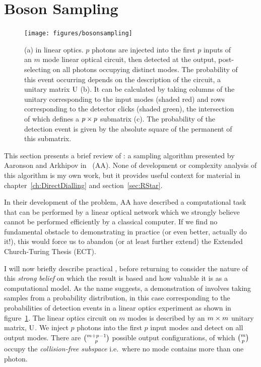 \section{Boson Sampling}
\label{sec:BosonSampling}
\begin{figure}
  \texttt{[image: figures/bosonsampling]}
  \caption[BosonSampling in linear optics]
  {(a) \bosonsampling{} in linear optics. \(p\) photons are injected into the
  first \(p\) inputs of an \(m\) mode linear optical circuit, then detected at
  the output, post-selecting on all photons occupying distinct modes. The
  probability of this event occurring depends on the description of the circuit,
  a unitary matrix \(\mathrm{U}\) (b). It can be calculated by taking columns of
  the unitary corresponding to the input modes (shaded red) and rows
  corresponding to the detector clicks (shaded green), the intersection of which
  defines a \(p \times p\) submatrix (c). The probability of the detection event is
  given by the absolute square of the permanent of this submatrix.}
  \label{fig:BosonSampling}
\end{figure}
This section presents a brief review of \bosonsampling{}: a sampling algorithm
presented by Aaronson and Arkhipov in~\cite{bosonsampling} (AA). None of
development or complexity analysis of this algorithm is my own work, but it
provides useful context for material in chapter~\ref{ch:DirectDialling} and
section~\ref{sec:RStar}.

In their development of the \bosonsampling{} problem, AA have described a
computational task that can be performed by a linear optical network which we
strongly believe cannot be performed efficiently by a classical computer. If we
find no
fundamental obstacle to demonstrating \bosonsampling{} in practice (or even
better, actually do it!), this would force us to abandon (or at least further
extend) the Extended Church-Turing Thesis (ECT).

I will now briefly describe practical \bosonsampling{}, before returning to
consider the nature of this \emph{strong belief} on which the result is based
and how valuable it is as a computational model. As the name suggests, a
demonstration of \bosonsampling{} involves taking samples from a probability
distribution, in this case corresponding to the probabilities of detection
events in a linear optics experiment as shown in figure~\ref{fig:BosonSampling}.
The linear optics circuit on \(m\) modes is described by an \(m \times m\) unitary
matrix, \(\mathrm{U}\). We inject \(p\) photons into the first \(p\) input modes
and detect on all output modes. There are \({m+p-1}\choose{p}\) possible output
configurations, of which \({m}\choose{p}\) occupy the \emph{collision-free
subspace} i.e.\ where no mode contains more than one photon.


